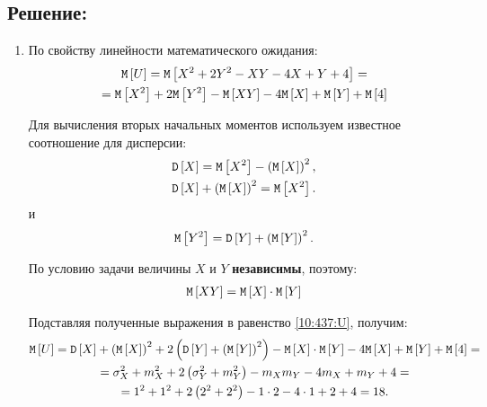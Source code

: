 \subsection*{Решение:}
\begin{enumerate}
    \item По свойству линейности математического ожидания:
    \begin{multline}
        \label{10:437:U}
        \mathtt{M} \left [ U \right ]
        = \mathtt{M} \left [ X^2 + 2 Y^2 - XY - 4X + Y + 4 \right ] = \\
        = \mathtt{M} \left [ X^2 \right ] + 2 \mathtt{M} \left [ Y^2 \right ] - \mathtt{M} \left [ XY \right ] - 4 \mathtt{M} \left [ X \right ] + \mathtt{M} \left [ Y \right ] + \mathtt{M} \left [ 4 \right ]
    \end{multline}

    Для вычисления вторых начальных моментов используем известное соотношение для дисперсии:
    \begin{gather}
        \mathtt{D} \left [ X \right ] = \mathtt{M} \left [ X^2 \right ] - \left ( \mathtt{M} \left [ X \right ] \right )^2 , \\
        \mathtt{D} \left [ X \right ] + \left ( \mathtt{M} \left [ X \right ] \right )^2 = \mathtt{M} \left [ X^2 \right ] \label{10:437:X_2}.
    \end{gather}
    и
    \begin{equation}
        \label{10:437:Y_2}
        \mathtt{M} \left [ Y^2 \right ] = \mathtt{D} \left [ Y \right ] + \left ( \mathtt{M} \left [ Y \right ] \right )^2.
    \end{equation}

    По условию задачи величины $X$ и $Y$ \textbf{независимы}, поэтому:
    \begin{gather}
        \mathtt{M} \left [ XY \right ] = \mathtt{M} \left [ X \right ] \cdot \mathtt{M} \left [ Y \right ]
    \end{gather}

    Подставляя полученные выражения в равенство \eqref{10:437:U}, получим:
    \begin{multline}
        \mathtt{M} \left [ U \right ]
        = \mathtt{D} \left [ X \right ] + \left ( \mathtt{M} \left [ X \right ] \right )^2 + 2 \left ( \mathtt{D} \left [ Y \right ] + \left ( \mathtt{M} \left [ Y \right ] \right )^2 \right ) - \mathtt{M} \left [ X \right ] \cdot \mathtt{M} \left [ Y \right ] - 4 \mathtt{M} \left [ X \right ] + \mathtt{M} \left [ Y \right ] + \mathtt{M} \left [ 4 \right ] = \\
        = \sigma_X^2 + m_X^2 + 2 \left ( \sigma_Y^2 + m_Y^2 \right ) - m_X m_Y - 4 m_X + m_Y + 4 = \\
        = 1^2 + 1^2 + 2 \left ( 2^2 + 2^2 \right ) - 1 \cdot 2 - 4 \cdot 1 + 2 + 4 = 18
        .
    \end{multline}


\end{enumerate}
